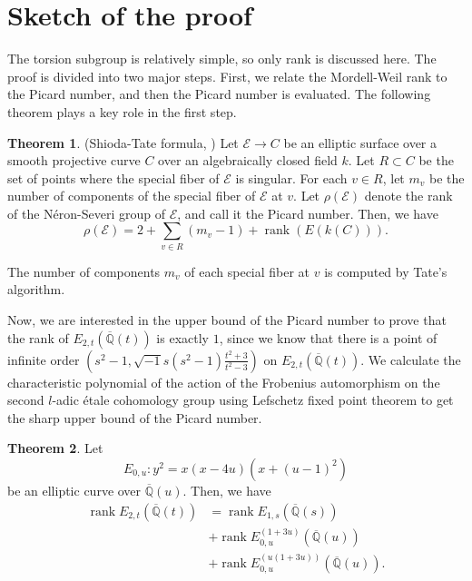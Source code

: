 \documentclass[a4paper]{jarticle} %
\theoremstyle{definition}
\newtheorem{thm}{Theorem}[section]
\theoremstyle{remark}
\DeclareMathOperator{\rank}{rank}
\newcommand{\Neron}{N\'eron}
\begin{document}
\section{Sketch of the proof}
The torsion subgroup is relatively simple, so only rank is discussed here.
The proof is divided into two major steps.
First, we relate the Mordell-Weil rank to the Picard number, and then the Picard number is evaluated.
The following theorem plays a key role in the first step.
\begin{thm}{(Shioda-Tate formula, \cite[Corollary 5.3]{ref:shioda1990})}
    \label{thm:shioda}
    Let $\mathcal{E} \to C$ be an elliptic surface over a smooth projective curve $C$ over an algebraically closed field $k$.
    Let $R \subset C$ be the set of points where the special fiber of $\mathcal{E}$ is singular.
    For each $v \in R$, let $m_{v}$ be the number of components of the special fiber of $\mathcal{E}$ at $v$.
    Let $\rho(\mathcal{E})$ denote the rank of the \Neron-Severi group of $\mathcal{E}$, and call it the Picard number.
    Then, we have
    \begin{equation*}
        \rho (\mathcal{E}) = 2 + \sum_{v \in R} (m_{v} - 1) + \rank(E(k(C))).
    \end{equation*}
\end{thm}
\vspace{1em}

The number of components $m_v$ of each special fiber at $v$ is computed by Tate's algorithm.

Now, we are interested in the upper bound of the Picard number to prove that the rank of $E_{2,t}(\overline{\mathbb{Q}}(t))$ is exactly $1$, since we know that there is a point of infinite order $(s^{2} - 1, \sqrt{-1} s(s^{2} - 1) \frac{t^{2} + 3}{t^{2} - 3} )$ on $E_{2,t}(\overline{\mathbb{Q}}(t))$.
We calculate the characteristic polynomial of the action of the Frobenius automorphism on the second $l$-adic \'etale cohomology group using Lefschetz fixed point theorem to get the sharp upper bound of the Picard number.

\begin{thm}
    Let
    \begin{equation*}
        E_{0,u}: y^{2} = x(x - 4u)(x + (u - 1)^{2})
    \end{equation*}
    be an elliptic curve over $\overline{\mathbb{Q}}(u)$.
    Then, we have
    \vspace{1em}
    \begin{equation*}
        \label{eq:rankdecomposition}
        \begin{aligned}
            \rank E_{2,t}(\overline{\mathbb{Q}}(t)) & = \rank E_{1,s}(\overline{\mathbb{Q}}(s))                \\
                                                    & + \rank E_{0,u}^{(1 + 3u)}(\overline{\mathbb{Q}}(u))     \\
                                                    & + \rank E_{0,u}^{(u(1 + 3u))}(\overline{\mathbb{Q}}(u)).
        \end{aligned}
    \end{equation*}
    \vspace{1em}
\end{thm}
\end{document}
